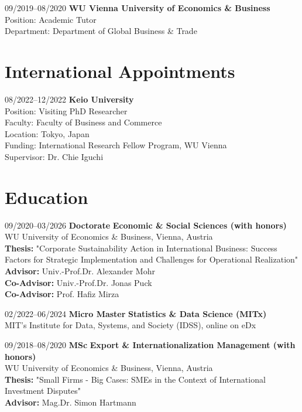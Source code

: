 \documentclass[11pt,a4paper]{article}
\begin{document}
\begin{cv}
\begin{cvlist}{}
    \item[09/2019--08/2020]
      {\textbf{WU Vienna University of Economics \& Business}}\\
      {Position:} Academic Tutor\\
      {Department:} Department of Global Business \& Trade\\
  \end{cvlist}

\section{International Appointments}
  \begin{cvlist}{}
    \item[08/2022--12/2022]
      {\textbf{Keio University}}\\
      {Position:} Visiting PhD Researcher\\
      {Faculty:} Faculty of Business and Commerce\\
      {Location:} Tokyo, Japan\\
      {Funding:} International Research Fellow Program, WU Vienna\\
      {Supervisor:} Dr. Chie Iguchi
  \end{cvlist}

\section{Education}
  \begin{cvlist}{}
  \item[09/2020--03/2026] 
      \textbf{Doctorate} {{\textbf{Economic \& Social Sciences (with honors)}}}\\ 
      WU University of Economics \& Business, Vienna, Austria\\
      \textbf{Thesis:} {"Corporate Sustainability Action in International Business: Success Factors for Strategic Implementation and Challenges for Operational Realization"}\\
      \textbf{Advisor:} {Univ.-Prof.Dr. Alexander Mohr}\\
      \textbf{Co-Advisor:} {Univ.-Prof.Dr. Jonas Puck}\\
      \textbf{Co-Advisor:} {Prof. Hafiz Mirza}
      
    \item[02/2022--06/2024] 
      \textbf{Micro Master} {{\textbf{Statistics \& Data Science (MITx)}}}\\ 
      MIT’s Institute for Data, Systems, and Society (IDSS), online on eDx
  \item[09/2018--08/2020] 
      \textbf{MSc} {{\textbf{Export \& Internationalization Management (with honors)}}}\\
      WU University of Economics \& Business, Vienna, Austria\\
      \textbf{Thesis:} "Small Firms - Big Cases: SMEs in the Context of International Investment Disputes" \\
      \textbf{Advisor:} {Mag.Dr. Simon Hartmann}
      

\end{cvlist}
\end{cv}
\end{document}
